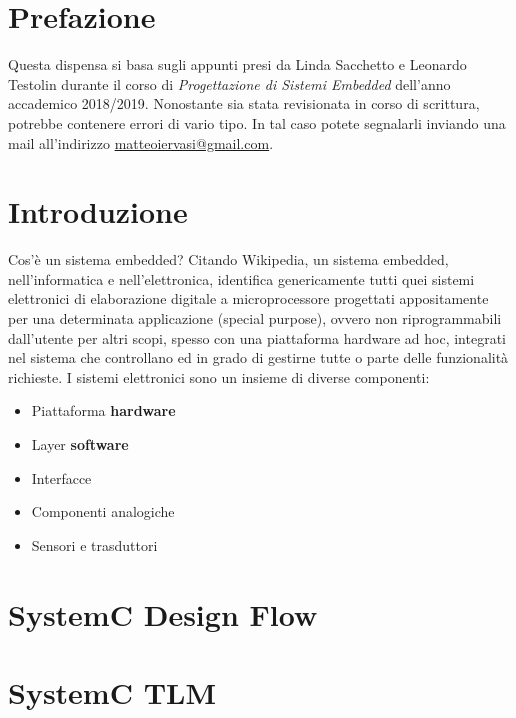 \documentclass[10pt,a4paper,titlepage]{article}
\begin{document}
\begin{frontespizio}
\end{frontespizio}

\tableofcontents
\newpage

\section*{Prefazione}
Questa dispensa si basa sugli appunti presi da Linda Sacchetto e Leonardo Testolin durante il corso di \textit{Progettazione di Sistemi Embedded} dell'anno accademico 2018/2019.
Nonostante sia stata revisionata in corso di scrittura, potrebbe contenere errori di vario tipo. In tal caso potete segnalarli inviando una mail all'indirizzo \href{mailto:matteoiervasi@gmail.com}{matteoiervasi@gmail.com}.
\newpage

\section{Introduzione}
Cos'è un sistema embedded? Citando Wikipedia, un sistema embedded, nell'informatica e nell'elettronica,
identifica genericamente tutti quei sistemi elettronici di elaborazione digitale a microprocessore progettati
appositamente per una determinata applicazione (special purpose), ovvero non riprogrammabili dall'utente per altri scopi,
spesso con una piattaforma hardware ad hoc, integrati nel sistema che controllano ed in grado di gestirne tutte o
parte delle funzionalità richieste.
I sistemi elettronici sono un insieme di diverse componenti:
\begin{itemize}
	\item Piattaforma \textbf{hardware}
	\item Layer \textbf{software}
	\item Interfacce
	\item Componenti analogiche
	\item Sensori e trasduttori
\end{itemize}


\section{SystemC Design Flow}
\section{SystemC TLM}
\end{document}
